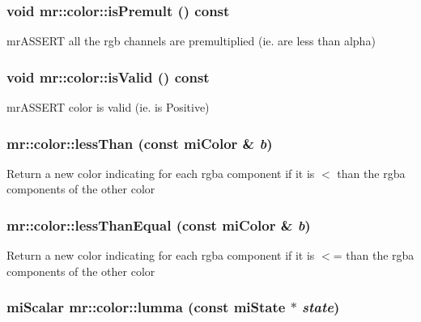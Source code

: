 \subsubsection{\setlength{\rightskip}{0pt plus 5cm}void mr::color::is\-Premult () const\hspace{0.3cm}{\tt  [inline]}}\label{structmr_1_1color_z8_3}


mr\-ASSERT all the rgb channels are premultiplied (ie. are less than alpha) 
\subsubsection{\setlength{\rightskip}{0pt plus 5cm}void mr::color::is\-Valid () const\hspace{0.3cm}{\tt  [inline]}}\label{structmr_1_1color_z8_0}


mr\-ASSERT color is valid (ie. is Positive) 

\subsubsection{ mr::color::less\-Than (const mi\-Color \& {\em b})\hspace{0.3cm}{\tt  [inline]}}\label{structmr_1_1color_z12_0}


Return a new color indicating for each rgba component if it is $<$ than the rgba components of the other color 
\subsubsection{ mr::color::less\-Than\-Equal (const mi\-Color \& {\em b})\hspace{0.3cm}{\tt  [inline]}}\label{structmr_1_1color_z12_1}


Return a new color indicating for each rgba component if it is $<$= than the rgba components of the other color 
\subsubsection{\setlength{\rightskip}{0pt plus 5cm}mi\-Scalar mr::color::lumma (const mi\-State $\ast$ {\em state})\hspace{0.3cm}{\tt  [inline]}}\label{structmr_1_1color_z16_1}


